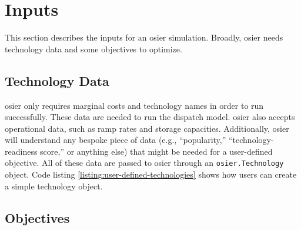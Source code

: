 \section{Inputs}




This section describes the inputs for an \ac{osier} simulation. Broadly, \ac{osier} needs
technology data and some objectives to optimize. 

\subsection{Technology Data}
\ac{osier} only requires marginal costs and technology names in order to run successfully.
These data are needed to run the dispatch model. \ac{osier} also accepts operational data, such
as ramp rates and storage capacities. Additionally, \ac{osier} will understand any bespoke 
piece of data (e.g., ``popularity,'' ``technology-readiness score,'' or anything else) that
might be needed for a user-defined objective. All of these data are passed to \ac{osier}
through an \texttt{osier.Technology} object. Code listing \ref{listing:user-defined-technologies}
shows how users can create a simple technology object.


\subsection{Objectives}
\label{section:osier_objectives}

